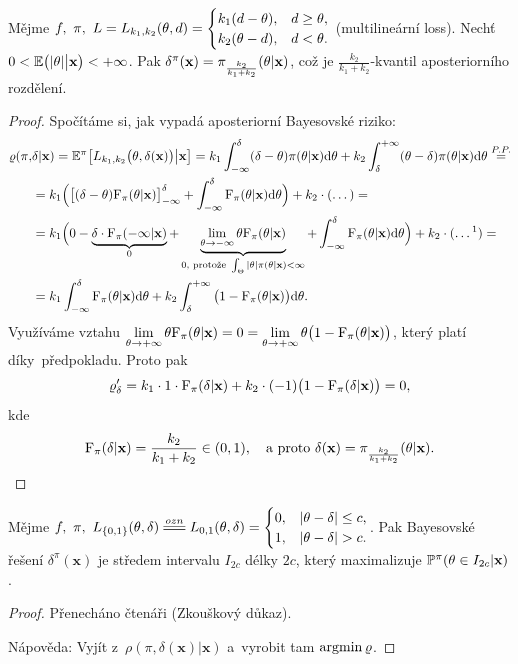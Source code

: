 \begin{theorem}\label{veta7}
	Mějme $f,~\pi,~L=L_{k_1,k_2}(\theta,d)=\begin{cases}
	k_1(d-\theta),&d\geq \theta, \\ k_2(\theta-d),& d<\theta.
	\end{cases}$ (multilineární loss). Nechť $0<\mathbb{E}\big(|\theta|\big|\textbf{x}\big)<+\infty$. Pak $\delta^\pi(\textbf{x})=\pi_{\frac{k_2}{k_1+k_2}}(\theta|\textbf{x})$, což je $\frac{k_2}{k_1+k_2}$-kvantil aposteriorního rozdělení.	
	
	\begin{proof}
		Spočítáme si, jak vypadá aposteriorní Bayesovské riziko:
		\[
		\begin{split}
		\rho(\pi,&\delta|\textbf{x})=\E^{\pi}\big[L_{k_1,k_2}\big(\t,\delta(\textbf{x})\big)\big| \textbf{x}\big]=k_1\int_{-\infty}^\delta (\delta-\t)\pi(\t|\textbf{x})\d\t+k_2\int_\delta^{+\infty}(\t-\delta)\pi(\t|\textbf{x})\d\t\stackrel{P.P.}{=}\\
		&=k_1\Big(\big[(\delta-\t)\FF_\pi(\t|\textbf{x})\big]_{-\infty}^\delta+\int_{-\infty}^\delta \FF_\pi(\t|\textbf{x})\d\t\Big)+k_2\cdot (\dots)=\\
		&=k_1\Big( 0-\underbrace{\delta\cdot\FF_\pi(-\infty|\textbf{x})}_{0}+\underbrace{\lim\limits_{\t\to-\infty}\t\FF_\pi(\t|\textbf{x})}_{0\text{, protože }\int_\Theta |\t|\pi(\t|\textbf{x})<\infty}+\int_{-\infty}^\delta \FF_\pi(\t|\textbf{x})\d\t \Big)+k_2\cdot (\dots\text{\footnotemark})=\\
		&=k_1\int_{-\infty}^\delta \FF_\pi(\t|\textbf{x})\d\t+k_2\int_\delta^{+\infty}\big(1-\FF_\pi(\t|\textbf{x})\big)\d\t.
		\end{split}
		\]
		Využíváme vztahu
		$\lim\limits_{\theta\to+\infty}\theta\mathrm{F}_{\pi}(\theta|\textbf{x})=0=\lim\limits_{\theta\to+\infty}\theta\big(1-\mathrm{F}_{\pi}(\theta|\textbf{x})\big)$, který platí díky~předpokladu.			Proto pak
		$$\varrho_\delta'=k_1\cdot 1\cdot\mathrm{F}_\pi(\delta|\textbf{x})+k_2\cdot(-1)\big(1-\mathrm{F}_\pi(\delta|\textbf{x})\big)=0,$$
		kde
		$$\mathrm{F}_\pi(\delta|\textbf{x})=\frac{k_2}{k_1+k_2}\in(0,1),\quad\text{a proto } \delta(\textbf{x})=\pi_{\frac{k_2}{k_1+k_2}}(\theta|\textbf{x}).$$
		
	\end{proof} 
	
	
\end{theorem}
\begin{theorem}
	Mějme $f,~\pi,~L_{\{0,1\}}(\t,\delta)\equal{ozn}L_{0,1}(\t,\delta)=\begin{cases}
	0,&|\t-\delta|\leq c,\\1,& |\t-\delta|>c.
	\end{cases}$. Pak Bayesovské řešení $\delta^\pi(\textbf{x})$ je středem intervalu $I_{2c}$ délky $2c$, který maximalizuje $\mathbb{P}^\pi(\theta\in I_{2c}|\textbf{x})$.
	\begin{proof}
		Přenecháno čtenáři (Zkouškový důkaz).
		
		Nápověda: Vyjít z~$\rho(\pi,\delta(\textbf{x})|\textbf{x})$ a~vyrobit tam $\mathop{\mathrm{argmin}} \varrho$.
	\end{proof}
\end{theorem}
\FloatBarrier

